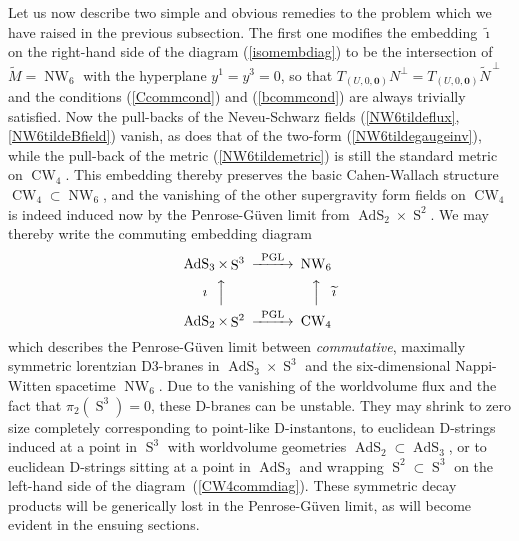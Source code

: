 \documentclass[11pt,a4paper]{article}
\DeclareMathOperator{\AdS}{AdS}
\DeclareMathOperator{\Sphere}{S}
\DeclareMathOperator{\NW}{NW}
\DeclareMathOperator{\CW}{CW}
\let\S\Sphere
\newcommand{\mbf}[1]{{\boldsymbol {#1} }}
\begin{document}
Let us now describe two simple and obvious remedies to the problem
which we have raised in the previous subsection. The first one modifies the
embedding $\widetilde{\imath}$ on the right-hand side of the diagram
(\ref{isomembdiag}) to be the intersection of $\widetilde{M}=\NW_6$
with the hyperplane $y^1=y^3=0$, so that
 $T_{(U,0,\mbf0)}N^\perp=T_{(U,0,\mbf0)}\widetilde{N}^{\,\perp}$ and the
conditions (\ref{Ccommcond}) and (\ref{bcommcond}) are always
trivially satisfied. Now the pull-backs of the Neveu-Schwarz fields
(\ref{NW6tildeflux},\ref{NW6tildeBfield}) vanish, as does that of the
two-form (\ref{NW6tildegaugeinv}), while the pull-back
of the metric (\ref{NW6tildemetric}) is still the standard metric on
$\CW_4$. This embedding thereby preserves the basic Cahen-Wallach
structure $\CW_4\subset\NW_6$, and the vanishing of the other
supergravity form fields on $\CW_4$ is indeed induced now by the
Penrose-G\"uven limit from $\AdS_2\times\S^2$. We may thereby write
the commuting embedding diagram
\begin{equation}
  \label{CW4commdiag}
  \begin{CD}
    \AdS_3 \times \S^3             @>\text{PGL}>> \NW_6\\
    \text{$\imath~~$}@AAA @AAA\text{$\widetilde{\imath}$}\\
    \AdS_2 \times \S^2             @>\text{PGL}>> \CW_4\\
  \end{CD}
\end{equation}
which describes the Penrose-G\"uven limit between {\it commutative},
maximally symmetric lorentzian D3-branes in $\AdS_3\times\S^3$ and the
six-dimensional Nappi-Witten spacetime $\NW_6$. Due to the vanishing
of the worldvolume flux and the fact that $\pi_2(\S^3)=0$, these
D-branes can be unstable. They may shrink to zero size completely
corresponding to point-like D-instantons, to euclidean D-strings induced at a
point in $\S^3$ with worldvolume geometries $\AdS_2\subset\AdS_3$, or
to euclidean D-strings sitting at a point in $\AdS_3$ and wrapping
$\S^2\subset\S^3$  on the left-hand side of the
diagram~(\ref{CW4commdiag}). These symmetric decay products will be
generically lost in the Penrose-G\"uven limit, as will become evident
in the ensuing sections.
\end{document}
